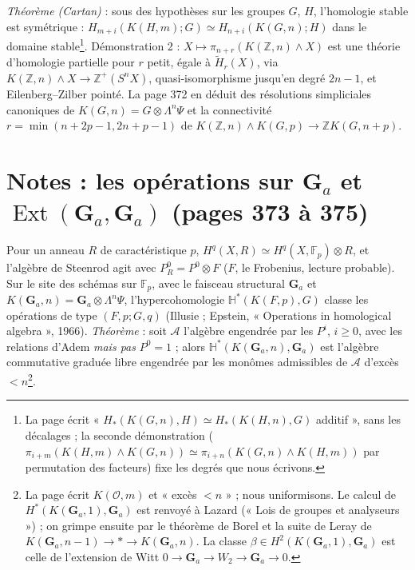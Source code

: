 \documentclass[11pt,a4paper]{article}
\begin{document}
\emph{Théorème (Cartan)} : sous des hypothèses sur les groupes $G$, $H$,
l'homologie stable est symétrique : $H_{m+i}(K(H,m); G) \simeq H_{n+i}(K(G,n);
H)$ dans le domaine stable\footnote{La page écrit « $H_*(K(G,n),H) \simeq
H_*(K(H,n),G)$ additif », sans les décalages ; la seconde démonstration
($\pi_{i+m}(K(H,m) \wedge K(G,n)) \simeq \pi_{i+n}(K(G,n) \wedge K(H,m))$ par
permutation des facteurs) fixe les degrés que nous écrivons.}. Démonstration
2 : $X \mapsto \pi_{n+r}(K(\mathbb{Z},n) \wedge X)$ est une théorie
d'homologie partielle pour $r$ petit, égale à $\widetilde{H}_r(X)$, via
$K(\mathbb{Z},n) \wedge X \to \mathbb{Z}^+(S^nX)$, quasi-isomorphisme jusqu'en
degré $2n-1$, et Eilenberg–Zilber pointé. La page 372 en déduit des
résolutions simpliciales canoniques de $K(G,n) = G \otimes \Lambda^n\Psi$ et la
connectivité $r = \min(n + 2p - 1, 2n + p - 1)$ de $K(\mathbb{Z},n) \wedge K(G,p)
\to \mathbb{Z}K(G,n+p)$.

\section*{Notes : les opérations sur $\mathbf{G}_a$ et $\operatorname{Ext}(\mathbf{G}_a, \mathbf{G}_a)$ (pages 373 à 375)}

Pour un anneau $R$ de caractéristique $p$, $H^q(X, R) \simeq H^q(X, \mathbb{F}_p)
\otimes R$, et l'algèbre de Steenrod agit avec $P^0_R = P^0 \otimes F$ ($F$, le
Frobenius, lecture probable). Sur le site des schémas sur $\mathbb{F}_p$, avec le
faisceau structural $\mathbf{G}_a$ et $K(\mathbf{G}_a, n) = \mathbf{G}_a \otimes
\Lambda^n\Psi$, l'hypercohomologie $\mathbb{H}^*(K(F,p), G)$ classe les
opérations de type $(F,p;G,q)$ (Illusie ; Epstein, « Operations in homological
algebra », 1966). \emph{Théorème} : soit $\mathcal{A}$ l'algèbre engendrée par les
$P^i$, $i \geq 0$, avec les relations d'Adem \emph{mais pas} $P^0 = 1$ ; alors
$\mathbb{H}^*(K(\mathbf{G}_a, n), \mathbf{G}_a)$ est l'algèbre commutative graduée
libre engendrée par les monômes admissibles de $\mathcal{A}$ d'excès $< n$\footnote{La
page écrit $K(\mathcal{O}, m)$ et « excès $< n$ » ; nous uniformisons. Le calcul
de $H^*(K(\mathbf{G}_a, 1), \mathbf{G}_a)$ est renvoyé à Lazard (« Lois de groupes
et analyseurs ») ; on grimpe ensuite par le théorème de Borel et la suite de
Leray de $K(\mathbf{G}_a, n-1) \to * \to K(\mathbf{G}_a, n)$. La classe $\beta \in
H^2(K(\mathbf{G}_a,1), \mathbf{G}_a)$ est celle de l'extension de Witt $0 \to
\mathbf{G}_a \to W_2 \to \mathbf{G}_a \to 0$.}.
\end{document}
